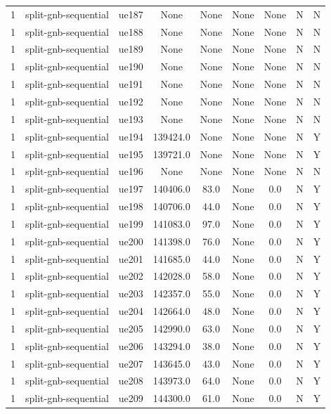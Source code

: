 \begin{table}[ht]
\begin{tabular}{|c|c|c|c|c|c|c|c|c|}
1 & split-gnb-sequential & ue187 & None & None & None & None & N & N \\
1 & split-gnb-sequential & ue188 & None & None & None & None & N & N \\
1 & split-gnb-sequential & ue189 & None & None & None & None & N & N \\
1 & split-gnb-sequential & ue190 & None & None & None & None & N & N \\
1 & split-gnb-sequential & ue191 & None & None & None & None & N & N \\
1 & split-gnb-sequential & ue192 & None & None & None & None & N & N \\
1 & split-gnb-sequential & ue193 & None & None & None & None & N & N \\
1 & split-gnb-sequential & ue194 & 139424.0 & None & None & None & N & Y \\
1 & split-gnb-sequential & ue195 & 139721.0 & None & None & None & N & Y \\
1 & split-gnb-sequential & ue196 & None & None & None & None & N & N \\
1 & split-gnb-sequential & ue197 & 140406.0 & 83.0 & None & 0.0 & N & Y \\
1 & split-gnb-sequential & ue198 & 140706.0 & 44.0 & None & 0.0 & N & Y \\
1 & split-gnb-sequential & ue199 & 141083.0 & 97.0 & None & 0.0 & N & Y \\
1 & split-gnb-sequential & ue200 & 141398.0 & 76.0 & None & 0.0 & N & Y \\
1 & split-gnb-sequential & ue201 & 141685.0 & 44.0 & None & 0.0 & N & Y \\
1 & split-gnb-sequential & ue202 & 142028.0 & 58.0 & None & 0.0 & N & Y \\
1 & split-gnb-sequential & ue203 & 142357.0 & 55.0 & None & 0.0 & N & Y \\
1 & split-gnb-sequential & ue204 & 142664.0 & 48.0 & None & 0.0 & N & Y \\
1 & split-gnb-sequential & ue205 & 142990.0 & 63.0 & None & 0.0 & N & Y \\
1 & split-gnb-sequential & ue206 & 143294.0 & 38.0 & None & 0.0 & N & Y \\
1 & split-gnb-sequential & ue207 & 143645.0 & 43.0 & None & 0.0 & N & Y \\
1 & split-gnb-sequential & ue208 & 143973.0 & 64.0 & None & 0.0 & N & Y \\
1 & split-gnb-sequential & ue209 & 144300.0 & 61.0 & None & 0.0 & N & Y \\

\end{tabular}
\end{table}
